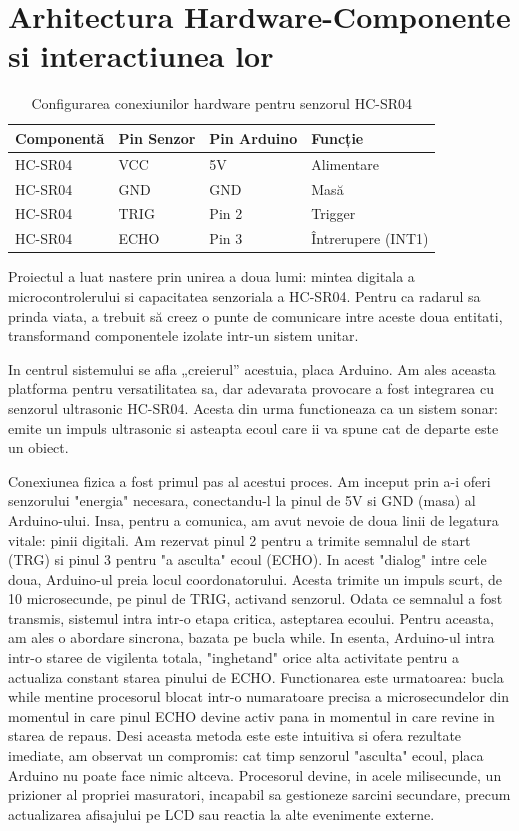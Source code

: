 \documentclass[conference]{IEEEtran}
\begin{document}
\section{Arhitectura Hardware-Componente si interactiunea lor}
\begin{table}[h]
    \centering
    
    \label{tab:conexiuni}
    \begin{tabular}{|l|l|l|l|}
        \hline
        \textbf{Componentă} & \textbf{Pin Senzor} & \textbf{Pin Arduino} & \textbf{Funcție} \\ \hline
        HC-SR04 & VCC & 5V & Alimentare \\ \hline
        HC-SR04 & GND & GND & Masă \\ \hline
        HC-SR04 & TRIG & Pin 2 & Trigger \\ \hline
        HC-SR04 & ECHO & Pin 3 & Întrerupere (INT1) \\ \hline
    \end{tabular}
    \caption{Configurarea conexiunilor hardware pentru senzorul HC-SR04}
\end{table}
Proiectul a luat nastere prin unirea a doua lumi: mintea digitala a microcontrolerului si capacitatea senzoriala a HC-SR04. Pentru ca radarul sa prinda viata, a trebuit să creez o punte de comunicare intre aceste doua entitati, transformand componentele izolate intr-un sistem unitar.

In centrul sistemului se afla „creierul” acestuia, placa Arduino. Am ales aceasta platforma pentru versatilitatea sa, dar adevarata provocare a fost integrarea cu senzorul ultrasonic HC-SR04. Acesta din urma functioneaza ca un sistem sonar: emite un impuls ultrasonic si asteapta ecoul care ii va spune cat de departe este un obiect.

Conexiunea fizica a fost primul pas al acestui proces. Am inceput prin a-i oferi senzorului "energia" necesara, conectandu-l la pinul de 5V si GND (masa) al Arduino-ului. Insa, pentru a comunica, am avut nevoie de doua linii de legatura vitale: pinii digitali. Am rezervat pinul 2 pentru a trimite semnalul de start (TRG) si pinul 3 pentru "a asculta" ecoul (ECHO). In acest "dialog" intre cele doua, Arduino-ul preia locul coordonatorului. Acesta trimite un impuls scurt, de 10 microsecunde, pe pinul de TRIG, activand senzorul. Odata ce semnalul a fost transmis, sistemul intra intr-o etapa critica, asteptarea ecoului. Pentru aceasta, am ales o abordare sincrona, bazata pe bucla while. In esenta, Arduino-ul intra intr-o staree de vigilenta totala, "inghetand" orice alta activitate pentru a actualiza constant starea pinului de ECHO.
Functionarea este urmatoarea: bucla while mentine procesorul blocat intr-o numaratoare precisa a microsecundelor din momentul in care pinul ECHO devine activ pana in momentul in care revine in starea de repaus. Desi aceasta metoda este este intuitiva si ofera rezultate imediate, am observat un compromis: cat timp senzorul "asculta" ecoul, placa Arduino nu poate face nimic altceva. Procesorul devine, in acele milisecunde, un prizioner al propriei masuratori, incapabil sa gestioneze sarcini secundare, precum actualizarea afisajului pe LCD sau reactia la alte evenimente externe.
\end{document}
